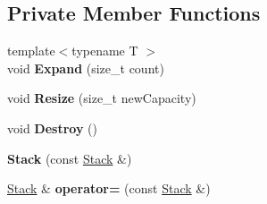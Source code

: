 \subsection*{Private Member Functions}
\begin{DoxyCompactItemize}
\item 
{\footnotesize template$<$typename T $>$ }\\void {\bfseries Expand} (size\+\_\+t count)\hypertarget{classinternal_1_1_stack_a5a530d1d2a39a05812e4fee0e299004a}{}\label{classinternal_1_1_stack_a5a530d1d2a39a05812e4fee0e299004a}

\item 
void {\bfseries Resize} (size\+\_\+t new\+Capacity)\hypertarget{classinternal_1_1_stack_a0a23948aa17a9870a5e228d465e40e92}{}\label{classinternal_1_1_stack_a0a23948aa17a9870a5e228d465e40e92}

\item 
void {\bfseries Destroy} ()\hypertarget{classinternal_1_1_stack_a5efa6fdbfaf93c5e519a2e6f39bd081f}{}\label{classinternal_1_1_stack_a5efa6fdbfaf93c5e519a2e6f39bd081f}

\item 
{\bfseries Stack} (const \hyperlink{classinternal_1_1_stack}{Stack} \&)\hypertarget{classinternal_1_1_stack_af4109a9e632f85f70ac01c69d3ccdb3b}{}\label{classinternal_1_1_stack_af4109a9e632f85f70ac01c69d3ccdb3b}

\item 
\hyperlink{classinternal_1_1_stack}{Stack} \& {\bfseries operator=} (const \hyperlink{classinternal_1_1_stack}{Stack} \&)\hypertarget{classinternal_1_1_stack_ae21d491cc0c4a22a2c131d88c0a37ae1}{}\label{classinternal_1_1_stack_ae21d491cc0c4a22a2c131d88c0a37ae1}

\end{DoxyCompactItemize}
